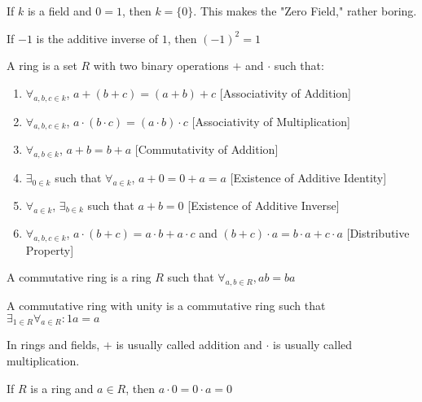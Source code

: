 \documentclass[crop=false,class=article,oneside]{standalone}
\begin{document}
            \begin{remark}
            If $k$ is a field and $0=1$, then $k=\{0\}$. This makes the "Zero Field," rather boring.
            \end{remark}
            \begin{theorem}
            If $-1$ is the additive inverse of $1$, then $(-1)^2 = 1$
            \end{theorem}
            \begin{definition}
            A ring is a set $R$ with two binary operations $+$ and $\cdot$ such that:
            \begin{enumerate}
                \item $\forall_{a,b,c\in k}$, $a+(b+c)=(a+b)+c$ \hfill [Associativity of Addition]
                \item $\forall_{a,b,c\in k}$, $a\cdot(b\cdot c) = (a\cdot b)\cdot c$ \hfill [Associativity of Multiplication]
                \item $\forall_{a,b\in k}$, $a+b=b+a$ \hfill [Commutativity of Addition]
                \item $\exists_{0 \in k}$ such that $\forall_{a\in k}$, $a+0=0+a = a$ \hfill [Existence of Additive Identity]
                \item $\forall_{a\in k}$, $\exists_{b\in k}$ such that $a+b=0$ \hfill [Existence of Additive Inverse]
                \item $\forall_{a,b,c\in k}$, $a\cdot(b+c) = a\cdot b + a\cdot c$ and $(b+c)\cdot a = b\cdot a + c\cdot a$ \hfill [Distributive Property]
            \end{enumerate}
            \end{definition}
            \begin{definition}
            A commutative ring is a ring $R$ such that $\forall_{a,b\in R},ab=ba$
            \end{definition}
            \begin{definition}
            A commutative ring with unity is a commutative ring such that $\exists_{1\in R}\forall_{a\in R}:1a=a$
            \end{definition}
            \begin{remark}
            In rings and fields, $+$ is usually called addition and $\cdot$ is usually called multiplication.
            \end{remark}
            \begin{corollary}
            If $R$ is a ring and $a\in R$, then $a\cdot 0 = 0\cdot a=0$
            \end{corollary}
\end{document}

